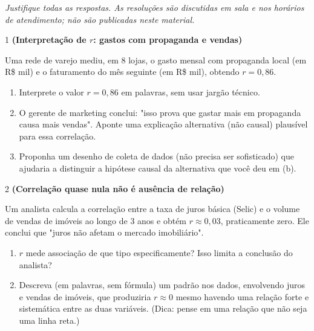 \documentclass[11pt]{article}
\begin{document}

\noindent \textit{Justifique todas as respostas. As resoluções são discutidas em sala e nos horários de atendimento; não são publicadas neste material.}

\begin{questao}{1} \textbf{(Interpretação de $r$: gastos com propaganda e vendas)}

Uma rede de varejo mediu, em 8 lojas, o gasto mensal com propaganda local (em R\$ mil) e o
faturamento do mês seguinte (em R\$ mil), obtendo $r = 0{,}86$.

\begin{enumerate}[label=(\alph*)]
  \item Interprete o valor $r=0{,}86$ em palavras, sem usar jargão técnico.
  \item O gerente de marketing conclui: "isso prova que gastar mais em propaganda causa mais
    vendas". Aponte uma explicação alternativa (não causal) plausível para essa correlação.
  \item Proponha um desenho de coleta de dados (não precisa ser sofisticado) que ajudaria a
    distinguir a hipótese causal da alternativa que você deu em (b).
\end{enumerate}
\end{questao}

\begin{questao}{2} \textbf{(Correlação quase nula não é ausência de relação)}

Um analista calcula a correlação entre a taxa de juros básica (Selic) e o volume de vendas de
imóveis ao longo de 3 anos e obtém $r \approx 0{,}03$, praticamente zero. Ele conclui que "juros
não afetam o mercado imobiliário".

\begin{enumerate}[label=(\alph*)]
  \item $r$ mede associação de que tipo especificamente? Isso limita a conclusão do analista?
  \item Descreva (em palavras, sem fórmula) um padrão nos dados, envolvendo juros e vendas de
    imóveis, que produziria $r\approx 0$ mesmo havendo uma relação forte e sistemática entre as
    duas variáveis. (Dica: pense em uma relação que não seja uma linha reta.)
\end{enumerate}
\end{questao}
\end{document}
